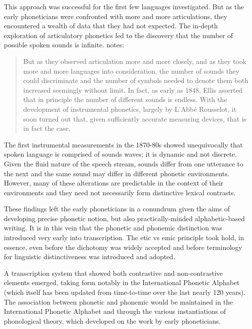 This approach was successful for the first few languages investigated. But as
the early phoneticians were confronted with more and more articulations, they
encountered a wealth of data that they had not expected. The in-depth
exploration of articulatory phonetics led to the discovery that the number of
possible spoken sounds is infinite. \cite{Hockett1995} notes:

\begin{quote} 
 
But as they observed articulation more and more closely, and as
they took more and more languages into consideration, the number of sounds they
could discriminate and the number of symbols needed to denote them both
increased seemingly without limit. In fact, as early as 1848, Ellis asserted
that in principle the number of different sounds is endless. With the
development of instrumental phonetics, largely by L'Abbé Rousselot, it soon
turned out that, given sufficiently accurate measuring devices, that is in fact
the case.

\end{quote}



The first instrumental measurements in the 1870-80s showed unequivocally that
spoken language is comprised of sounds waves; it is dynamic and not discrete.
Given the fluid nature of the speech stream, sounds differ from one utterance to
the next and the same sound may differ in different phonetic environments.
However, many of these alterations are predictable in the context of their
environments and they need not necessarily form distinctive lexical contrasts.

These findings left the early phoneticians in a conundrum given the aims of
developing precise phonetic notion, but also practically-minded alphabetic-based
writing. It is in this vein that the phonetic and phonemic distinction was
introduced very early into transcription. The etic vs emic principle took hold,
in essence, even before the dichotomy was widely accepted and before terminology
for linguistic distinctiveness was introduced and adopted.

A transcription system that showed both contrastive and non-contrastive elements
emerged, taking form notably in the International Phonetic Alphabet (which
itself has been updated from time-to-time over the last nearly 120 years). The
association between phonetic and phonemic would be maintained in the
International Phonetic Alphabet and through the various instantiations of
phonological theory, which developed on the work by early phoneticians.

